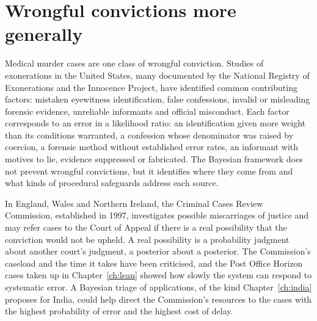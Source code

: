 \section{Wrongful convictions more generally}

Medical murder cases are one class of wrongful conviction. Studies of exonerations in the United States, many documented by the National Registry of Exonerations and the Innocence Project, have identified common contributing factors: mistaken eyewitness identification, false confessions, invalid or misleading forensic evidence, unreliable informants and official misconduct. Each factor corresponds to an error in a likelihood ratio: an identification given more weight than its conditions warranted, a confession whose denominator was raised by coercion, a forensic method without established error rates, an informant with motives to lie, evidence suppressed or fabricated. The Bayesian framework does not prevent wrongful convictions, but it identifies where they come from and what kinds of procedural safeguards address each source.

In England, Wales and Northern Ireland, the Criminal Cases Review Commission, established in 1997, investigates possible miscarriages of justice and may refer cases to the Court of Appeal if there is a real possibility that the conviction would not be upheld. A real possibility is a probability judgment about another court's judgment, a posterior about a posterior. The Commission's caseload and the time it takes have been criticised, and the Post Office Horizon cases taken up in Chapter~\ref{ch:lean} showed how slowly the system can respond to systematic error. A Bayesian triage of applications, of the kind Chapter~\ref{ch:india} proposes for India, could help direct the Commission's resources to the cases with the highest probability of error and the highest cost of delay.

